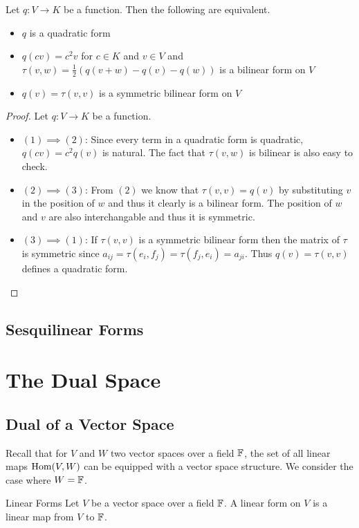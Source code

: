 \documentclass[a4paper]{article}
\begin{document}
\begin{prp}{}{} Let $q:V\to K$ be a function. Then the following are equivalent. 
\begin{itemize}
\item $q$ is a quadratic form
\item $q(cv)=c^2v$ for $c\in K$ and $v\in V$ and $\tau(v,w)=\frac{1}{2}(q(v+w)-q(v)-q(w))$ is a bilinear form on $V$
\item $q(v)=\tau(v,v)$ is a symmetric bilinear form on $V$
\end{itemize} \tcbline
\begin{proof}
Let $q:V\to K$ be a function. 
\begin{itemize}
\item $(1)\implies (2)$: Since every term in a quadratic form is quadratic, $q(cv)=c^2q(v)$ is natural. The fact that $\tau(v,w)$ is bilinear is also easy to check. 
\item $(2)\implies (3)$: From $(2)$ we know that $\tau(v,v)=q(v)$ by substituting $v$ in the position of $w$ and thus it clearly is a bilinear form. The position of $w$ and $v$ are also interchangable and thus it is symmetric. 
\item $(3)\implies (1)$: If $\tau(v,v)$ is a symmetric bilinear form then the matrix of $\tau$ is symmetric since $a_{ij}=\tau(e_i,f_j)=\tau(f_j,e_i)=a_{ji}$. Thus $q(v)=\tau(v,v)$ defines a quadratic form. 
\end{itemize}
\end{proof}
\end{prp}

\subsection{Sesquilinear Forms}

\pagebreak
\section{The Dual Space}
\subsection{Dual of a Vector Space}
Recall that for $V$ and $W$ two vector spaces over a field $\mathbb{F}$, the set of all linear maps $\operatorname{Hom}(V,W)$ can be equipped with a vector space structure. We consider the case where $W=\mathbb{F}$. 

\begin{defn}{Linear Forms}{} Let $V$ be a vector space over a field $\mathbb{F}$. A linear form on $V$ is a linear map from $V$ to $\mathbb{F}$. 
\end{defn}
\end{document}
